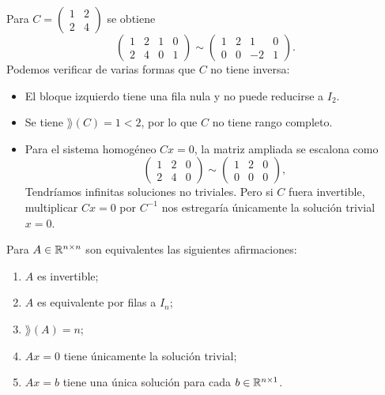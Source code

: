 \documentclass[compacto,10pt]{pubciencias-notas}
\begin{document}
\begin{ejem}
    Para $C=\begin{pmatrix}1&2\\2&4\end{pmatrix}$ se obtiene
    \[
        \left(\begin{array}{cc|cc}1&2&1&0\\2&4&0&1\end{array}\right)
        \sim
        \left(\begin{array}{cc|cc}1&2&1&0\\0&0&-2&1\end{array}\right).
    \]
    Podemos verificar de varias formas que $C$ no tiene inversa:
    \begin{itemize}
        \item El bloque izquierdo tiene una fila nula y no puede reducirse a
              $I_2$.
        \item Se tiene $\rang(C)=1<2$, por lo que $C$ no tiene rango completo.
        \item Para el sistema homogéneo $Cx=0$, la matriz ampliada se escalona
              como
              \[
                  \left(\begin{array}{cc|c}1&2&0\\2&4&0\end{array}\right)
                  \sim
                  \left(\begin{array}{cc|c}1&2&0\\0&0&0\end{array}\right),
              \]
              Tendríamos infinitas soluciones no triviales. Pero si $C$ fuera invertible, multiplicar
              $Cx=0$ por $C^{-1}$ nos estregaría únicamente la solución trivial $x=0$.
    \end{itemize}
\end{ejem}

\begin{prop}
    Para $A\in\Mat[\R]{n}{n}$ son equivalentes las siguientes afirmaciones:
    \begin{enumerate}
        \item $A$ es invertible;
        \item $A$ es equivalente por filas a $I_n$;
        \item $\rang(A)=n$;
        \item $Ax=0$ tiene únicamente la solución trivial;
        \item $Ax=b$ tiene una única solución para cada
              $b\in\Mat[\R]{n}{1}$.
    \end{enumerate}
\end{prop}
\end{document}
